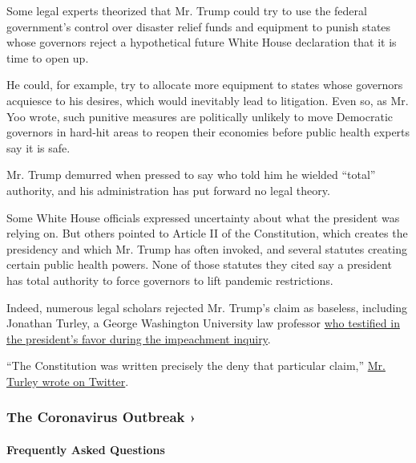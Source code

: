Some legal experts theorized that Mr. Trump could try to use the federal
government's control over disaster relief funds and equipment to punish
states whose governors reject a hypothetical future White House
declaration that it is time to open up.

He could, for example, try to allocate more equipment to states whose
governors acquiesce to his desires, which would inevitably lead to
litigation. Even so, as Mr. Yoo wrote, such punitive measures are
politically unlikely to move Democratic governors in hard-hit areas to
reopen their economies before public health experts say it is safe.

Mr. Trump demurred when pressed to say who told him he wielded ``total''
authority, and his administration has put forward no legal theory.

Some White House officials expressed uncertainty about what the
president was relying on. But others pointed to Article II of the
Constitution, which creates the presidency and which Mr. Trump has often
invoked, and several statutes creating certain public health powers.
None of those statutes they cited say a president has total authority to
force governors to lift pandemic restrictions.

Indeed, numerous legal scholars rejected Mr. Trump's claim as baseless,
including Jonathan Turley, a George Washington University law professor
\href{https://www.nytimes3xbfgragh.onion/2019/12/04/us/politics/trump-impeachment.html?searchResultPosition=2}{who
testified in the president's favor during the impeachment inquiry}.

``The Constitution was written precisely the deny that particular
claim,''
\href{https://twitter.com/JonathanTurley/status/1249837933038837760}{Mr.
Turley wrote on Twitter}.

\href{https://www.nytimes3xbfgragh.onion/news-event/coronavirus?action=click\&pgtype=Article\&state=default\&region=MAIN_CONTENT_3\&context=storylines_faq}{}

\hypertarget{the-coronavirus-outbreak-}{%
\subsubsection{The Coronavirus Outbreak
›}\label{the-coronavirus-outbreak-}}

\hypertarget{frequently-asked-questions}{%
\paragraph{Frequently Asked
Questions}\label{frequently-asked-questions}}

